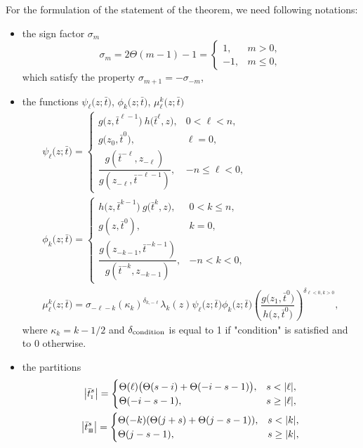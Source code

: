 \documentclass[10pt,a4paper]{amsart}
\newcommand{\so}{\scriptscriptstyle \rm I}
\newcommand{\sth}{\scriptscriptstyle \rm I\hspace{-1pt}I\hspace{-1pt}I}
\newcommand{\bt}{{\bar t}}
\theoremstyle{definition}
\begin{document}
For the formulation of the statement of the theorem, we need following
notations:
\begin{itemize}\itemsep=0pt
\item the sign factor $\sigma_m$
\[%
\sigma_m=2\Theta(m-1)-1=\begin{cases}
1,  &m>0,\\
-1,  &m\leq 0,
\end{cases}
\]
which satisfy the property
$
\sigma_{m+1}=-\sigma_{-m}$,
\item the functions $\psi_\ell\bigl(z;\bt\bigr)$, $\phi_k\bigl(z;\bt\bigr)$, $\mu^k_\ell\bigl(z;\bt\bigr)$
\begin{gather}%
\psi_\ell\bigl(z;\bt\bigr)=\begin{cases}
g\bigl(z,\bt^{\ell-1}\bigr)\ h\bigl(\bt^\ell,z\bigr), &0<\ell<n,\\
g\bigl(z_0,\bt^0\bigr), &\ell=0,\\
\dfrac{g(\bt^{-\ell},z_{-\ell})}{g(z_{-\ell},\bt^{-\ell-1})}, &-n\leq \ell<0,
\end{cases}\label{psi}
\\
\phi_k\bigl(z;\bt\bigr)=\begin{cases}
h\bigl(z,\bt^{k-1}\bigr)\ g\bigl(\bt^k,z\bigr), &0<k\leq n,\\
g(z,\bt^0), &k=0,\\
\dfrac{g(z_{-k-1},\bt^{-k-1})}{g(\bt^{-k},z_{-k-1})}, &-n< k<0,\label{phi}
\end{cases}
\\
\mu^k_\ell\bigl(z;\bt\bigr)=\sigma_{-\ell-k}
(\kappa_k)^{\delta_{k,-\ell}} \lambda_k(z) \psi_\ell\bigl(z;\bt\bigr) \phi_k\bigl(z;\bt\bigr)
\left(\dfrac{g\bigl(z_1,\bt^0\bigr)}{h\bigl(z,\bt^0\bigr)}\right)^{\delta_{\ell<0, k>0}} ,\nonumber
\end{gather}
where $\kappa_k=k-1/2$ and $\delta_{\rm condition}$ is equal to 1 if
 "condition" is satisfied and to 0 otherwise.
\item the partitions
\begin{gather}
\big|\bt^s_{\so}\big|=\begin{cases}
\Theta(\ell)\bigl(\Theta(s-i)+\Theta(-i-s-1)\bigr),& s<|\ell|,\\
\Theta(-i-s-1),& s\geq |\ell|,\label{part-so}
\end{cases}
\\
\big|\bt^s_{\sth}\big|=\begin{cases}
\Theta(-k)(\Theta(j+s)+\Theta(j-s-1)),& s<|k|,\\
\Theta(j-s-1),& s\geq |k|,

\end{cases}
\end{gather}
\end{itemize}
\end{document}
